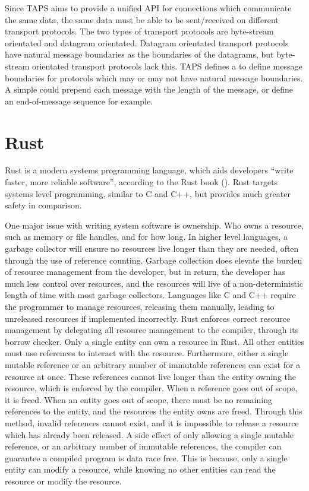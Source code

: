 Since TAPS aims to provide a unified API for connections which communicate the same data, the same data must be able to
be sent/received on different transport protocols.
The two types of transport protocols are byte-stream orientated and datagram orientated.
Datagram orientated transport protocols have natural message boundaries as the boundaries of the datagrams, but
byte-stream orientated transport protocols lack this.
TAPS defines a \framer{} to define message boundaries for protocols which may or may not have natural message
boundaries.
A simple \framer{} could prepend each message with the length of the message, or define an end-of-message sequence for
example.

\section{Rust}\label{sec:rust}
Rust is a modern systems programming language, which aids developers “write faster, more reliable software”, according
to the Rust book (\cite{kalbnik_rustprogramminglanguage_}).
Rust targets systems level programming, similar to C and C++, but provides much greater safety in comparison.

One major issue with writing system software is ownership.
Who owns a resource, such as memory or file handles, and for how long.
In higher level languages, a garbage collector will ensure no resources live longer than they are needed, often through
the use of reference counting.
Garbage collection does elevate the burden of resource management from the developer, but in return, the developer has
much less control over resources, and the resources will live of a non-deterministic length of time with most garbage
collectors.
Languages like C and C++ require the programmer to manage resources, releasing them manually, leading to unreleased
resources if implemented incorrectly.
Rust enforces correct resource management by delegating all resource management to the compiler, through its borrow
checker.
Only a single entity can own a resource in Rust.
All other entities must use references to interact with the resource.
Furthermore, either a single mutable reference or an arbitrary number of immutable references can exist for a resource
at once.
These references cannot live longer than the entity owning the resource, which is enforced by the compiler.
When a reference goes out of scope, it is freed.
When an entity goes out of scope, there must be no remaining references to the entity, and the resources the entity owns
are freed.
Through this method, invalid references cannot exist, and it is impossible to release a resource which has already been
released.
A side effect of only allowing a single mutable reference, or an arbitrary number of immutable references, the compiler
can guarantee a compiled program is data race free.
This is because, only a single entity can modify a resource, while knowing no other entities can read the resource or
modify the resource.

